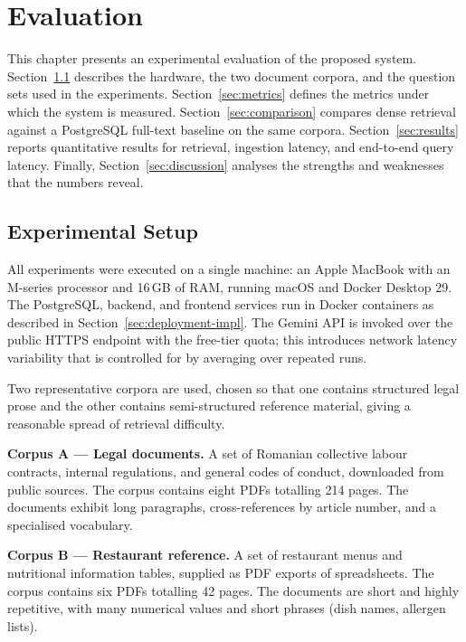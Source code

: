 \chapter{Evaluation}
\label{chap:evaluation}

This chapter presents an experimental evaluation of the proposed system.
Section~\ref{sec:experimental-setup} describes the hardware, the two
document corpora, and the question sets used in the experiments.
Section~\ref{sec:metrics} defines the metrics under which the system is
measured. Section~\ref{sec:comparison} compares dense retrieval
against a PostgreSQL full-text baseline on the same corpora.
Section~\ref{sec:results} reports quantitative results for retrieval,
ingestion latency, and end-to-end query latency. Finally,
Section~\ref{sec:discussion} analyses the strengths and weaknesses that
the numbers reveal.

\section{Experimental Setup}
\label{sec:experimental-setup}

All experiments were executed on a single machine: an Apple MacBook with
an M-series processor and 16\,GB of RAM, running macOS and Docker
Desktop 29. The PostgreSQL, backend, and frontend services run in
Docker containers as described in Section~\ref{sec:deployment-impl}.
The Gemini API is invoked over the public HTTPS endpoint with the
free-tier quota; this introduces network latency variability that is
controlled for by averaging over repeated runs.

Two representative corpora are used, chosen so that one contains
structured legal prose and the other contains semi-structured reference
material, giving a reasonable spread of retrieval difficulty.

\textbf{Corpus A --- Legal documents.} A set of Romanian collective
labour contracts, internal regulations, and general codes of conduct,
downloaded from public sources. The corpus contains eight PDFs
totalling 214 pages. The documents exhibit long paragraphs,
cross-references by article number, and a specialised vocabulary.

\textbf{Corpus B --- Restaurant reference.} A set of restaurant menus
and nutritional information tables, supplied as PDF exports of
spreadsheets. The corpus contains six PDFs totalling 42 pages. The
documents are short and highly repetitive, with many numerical values
and short phrases (dish names, allergen lists).

